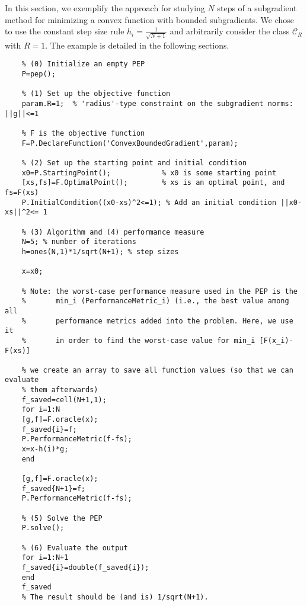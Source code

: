 \documentclass[11pt,a4paper]{article}
\begin{document}
	In this section, we exemplify the approach for studying $N$ steps of a subgradient method for minimizing a convex function with bounded subgradients. We chose to use the constant step size rule $h_i=\frac{1}{\sqrt{N+1}}$ and arbitrarily consider the class $\mathcal{C}_R$ with $R=1$. The example is detailed in the following sections.
	\begin{lstlisting}
	% (0) Initialize an empty PEP
	P=pep();

	% (1) Set up the objective function
	param.R=1;	% 'radius'-type constraint on the subgradient norms: ||g||<=1

	% F is the objective function
	F=P.DeclareFunction('ConvexBoundedGradient',param);

	% (2) Set up the starting point and initial condition
	x0=P.StartingPoint();            % x0 is some starting point
	[xs,fs]=F.OptimalPoint();        % xs is an optimal point, and fs=F(xs)
	P.InitialCondition((x0-xs)^2<=1); % Add an initial condition ||x0-xs||^2<= 1

	% (3) Algorithm and (4) performance measure
	N=5; % number of iterations
	h=ones(N,1)*1/sqrt(N+1); % step sizes

	x=x0;

	% Note: the worst-case performance measure used in the PEP is the
	%       min_i (PerformanceMetric_i) (i.e., the best value among all
	%       performance metrics added into the problem. Here, we use it
	%       in order to find the worst-case value for min_i [F(x_i)-F(xs)]

	% we create an array to save all function values (so that we can evaluate
	% them afterwards)
	f_saved=cell(N+1,1);
	for i=1:N
	[g,f]=F.oracle(x);
	f_saved{i}=f;
	P.PerformanceMetric(f-fs);
	x=x-h(i)*g;
	end

	[g,f]=F.oracle(x);
	f_saved{N+1}=f;
	P.PerformanceMetric(f-fs);

	% (5) Solve the PEP
	P.solve();

	% (6) Evaluate the output
	for i=1:N+1
	f_saved{i}=double(f_saved{i});
	end
	f_saved
	% The result should be (and is) 1/sqrt(N+1).
	\end{lstlisting}
	\newpage
\end{document}
